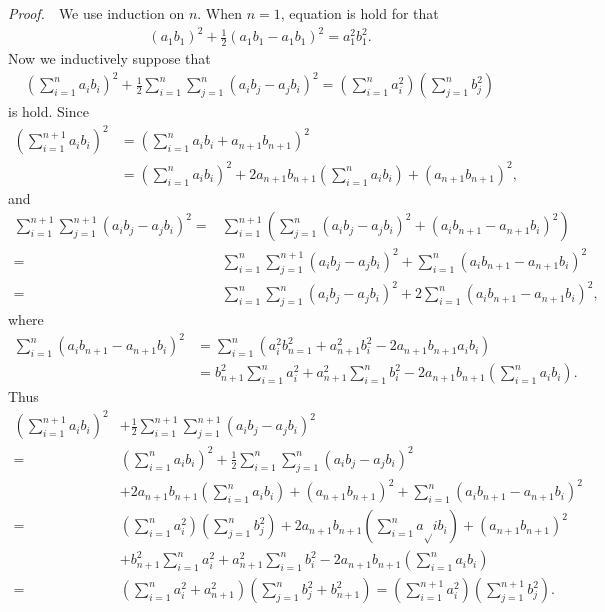 \documentclass{book}
\newcommand{\pff}{\vspace{.25em}\noindent\emph{Proof.}~~}
\begin{document}
\pff We use induction on $n$. When $n=1$, equation is hold for that
    \begin{align*}
        (a_1b_1)^2+\frac{1}{2}(a_1b_1-a_1b_1)^2=a_1^2b_1^2.
    \end{align*}
Now we inductively suppose that
    \begin{align*}
        \left(\sum_{i=1}^{n}a_ib_i\right)^2+\frac{1}{2}\sum_{i=1}^{n}\sum_{j=1}^{n}(a_ib_j-a_jb_i)^2
        =\left(\sum_{i=1}^{n}a_i^2\right)\left(\sum_{j=1}^{n}b_j^2\right)
    \end{align*}
is hold. Since
    \begin{align*}
        \left(\sum_{i=1}^{n+1}a_ib_i\right)^2
        &=\left(\sum_{i=1}^{n}a_ib_i+a_{n+1}b_{n+1}\right)^2\\
        &=\left(\sum_{i=1}^{n}a_ib_i\right)^2+2a_{n+1}b_{n+1}\left(\sum_{i=1}^{n}a_ib_i\right)+(a_{n+1}b_{n+1})^2,
    \end{align*}
and
    \begin{align*}
        \sum_{i=1}^{n+1}\sum_{j=1}^{n+1}(a_ib_j-a_jb_i)^2
        =&\sum_{i=1}^{n+1}\left(\sum_{j=1}^{n}(a_ib_j-a_jb_i)^2+(a_{i}b_{n+1}-a_{n+1}b_{i})^2\right)\\
        =&\sum_{i=1}^{n}\sum_{j=1}^{n+1}(a_ib_j-a_jb_i)^2+\sum_{i=1}^{n}(a_ib_{n+1}-a_{n+1}b_i)^2\\
        =&\sum_{i=1}^{n}\sum_{j=1}^{n}(a_ib_j-a_jb_i)^2+2\sum_{i=1}^{n}(a_ib_{n+1}-a_{n+1}b_i)^2,
    \end{align*}
where
    \begin{align*}
        \sum_{i=1}^{n}(a_ib_{n+1}-a_{n+1}b_i)^2
        &=\sum_{i=1}^{n}\left(a_i^2b_{n=1}^2+a_{n+1}^2b_i^2-2a_{n+1}b_{n+1}a_ib_i\right)\\
        &=b_{n+1}^2\sum_{i=1}^{n}a_i^2+a_{n+1}^2\sum_{i=1}^{n}b_i^2-2a_{n+1}b_{n+1}\left(\sum_{i=1}^{n}a_ib_i\right).
    \end{align*}
Thus
    \begin{align*}
        \left(\sum_{i=1}^{n+1}a_ib_i\right)^2&+\frac{1}{2}\sum_{i=1}^{n+1}\sum_{j=1}^{n+1}(a_ib_j-a_jb_i)^2\\
        =&\left(\sum_{i=1}^{n}a_ib_i\right)^2
        +\frac{1}{2}\sum_{i=1}^{n}\sum_{j=1}^{n}(a_ib_j-a_jb_i)^2\\
        &+2a_{n+1}b_{n+1}\left(\sum_{i=1}^{n}a_ib_i\right)+(a_{n+1}b_{n+1})^2+\sum_{i=1}^{n}(a_ib_{n+1}-a_{n+1}b_i)^2\\
        =&\left(\sum_{i=1}^{n}a_i^2\right)\left(\sum_{j=1}^{n}b_j^2\right)+2a_{n+1}b_{n+1}\left(\sum_{i=1}^{n}a_√ib_i\right)+(a_{n+1}b_{n+1})^2\\
        &+b_{n+1}^2\sum_{i=1}^{n}a_i^2+a_{n+1}^2\sum_{i=1}^{n}b_i^2-2a_{n+1}b_{n+1}\left(\sum_{i=1}^{n}a_ib_i\right)\\
        =&\left(\sum_{i=1}^{n}a_i^2+a_{n+1}^2\right)\left(\sum_{j=1}^{n}b_j^2+b_{n+1}^2\right)=\left(\sum_{i=1}^{n+1}a_i^2\right)\left(\sum_{j=1}^{n+1}b_j^2\right).
    \end{align*}
\end{document}
